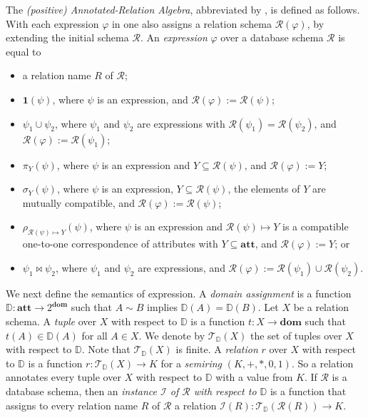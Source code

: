 The \emph{(positive) Annotated-Relation Algebra}, abbreviated by \ARA, is defined as follows. With each expression $\varphi$ in \ARA one also assigns a relation schema $\mathcal{R}(\varphi)$, by extending the initial schema
$\mathcal{R}$. An \emph{\ARA expression} $\varphi$ over a database schema $\mathcal{R}$ is equal to 
\begin{itemize}
\item a relation name $R$ of $\mathcal{R}$;
\item $\mathbf{1}(\psi)$, where $\psi$ is an \ARA expression, and $\mathcal{R}(\varphi) := \mathcal{R}(\psi)$;
\item $\psi_1 \cup \psi_2$, where $\psi_1$ and $\psi_2$ are \ARA expressions with $\mathcal{R}(\psi_1) = \mathcal{R}(\psi_2)$, and $\mathcal{R}(\varphi) := \mathcal{R}(\psi_1)$;
\item $\pi_Y(\psi)$, where $\psi$ is an \ARA expression and $Y \subseteq \mathcal{R}(\psi)$, and $\mathcal{R}(\varphi) := Y$;
\item $\sigma_{Y}(\psi)$, where $\psi$ is an \ARA expression, $Y \subseteq \mathcal{R}(\psi)$, the elements of $Y$ are mutually compatible, and $\mathcal{R}(\varphi) := \mathcal{R}(\psi)$;
\item $\rho_{\mathcal{R}(\psi) \mapsto Y}(\psi)$, where $\psi$ is an \ARA expression and $\mathcal{R}(\psi) \mapsto Y$ is a compatible one-to-one correspondence of attributes with $Y \subseteq \mathbf{att}$, and $\mathcal{R}(\varphi) := Y$; or
\item $\psi_1 \Join \psi_2$, where $\psi_1$ and $\psi_2$ are \ARA expressions, and $\mathcal{R}(\varphi) := \mathcal{R}(\psi_1) \cup \mathcal{R}(\psi_2)$.
\end{itemize}

We next define the semantics of \ARA expression.
A \emph{domain assignment} is a function $\mathbb{D}: \mathbf{att} \to
2^{\mathbf{dom}}$ such that $A \sim B$ implies
$\mathbb{D}(A) = \mathbb{D}(B)$. Let $X$ be a relation schema. A \emph{tuple} over
$X$ with respect to $\mathbb{D}$
is a function $t: X \to \mathbf{dom}$ such that
$t(A) \in \mathbb{D}(A)$ for all $A \in X$. We denote by
$\mathcal{T}_{\mathbb{D}}(X)$ the set of tuples over $X$ with respect to $\mathbb{D}$. Note that
$\mathcal{T}_{\mathbb{D}}(X)$ is finite.  A \emph{relation} $r$ over
$X$ with respect to $\mathbb{D}$ is a function $r:
\mathcal{T}_{\mathbb{D}}(X) \to K$ for a \emph{semiring} $(K,+,*,0,1)$. So a relation annotates every tuple
over $X$ with respect to $\mathbb{D}$ with a value from $K$.  If $\mathcal{R}$ is a
database schema, then an \emph{instance $\mathcal{I}$ of
$\mathcal{R}$ with respect to $\mathbb{D}$} is a function that assigns to every
relation name $R$ of $\mathcal{R}$ a relation $\mathcal{I}(R):
\mathcal{T}_{\mathbb{D}}(\mathcal{R}(R)) \to K$.

